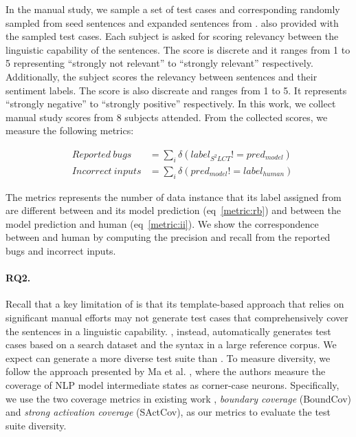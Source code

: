In the manual study, we sample a set of test cases and corresponding \lc randomly sampled
from seed sentences and expanded sentences from \tool. 
also provided with the sampled test cases. Each subject is asked for
scoring relevancy between the linguistic capability of the
sentences. The score is discrete and it ranges from 1 to 5
representing ``strongly not relevant'' to ``strongly relevant''
respectively. Additionally, the subject scores the relevancy between
sentences and their sentiment labels. The score is also discreate and
ranges from 1 to 5. It represents ``strongly negative'' to ``strongly
positive'' respectively. In this work, we collect manual study scores
from 8 subjects attended. From the collected scores, we measure the
following metrics:

\begin{eqnarray}
  &Reported\:bugs &=\sum_{i} \delta(label_{S^2LCT}!=pred_{model}) \label{metric:rb}\\
  &Incorrect\:inputs &= \sum_{i} \delta(pred_{model}!=label_{human}) \label{metric:ii}
\end{eqnarray}

The metrics represents the number of data instance that its label
assigned from are different between \tool and its model prediction
(eq~\ref{metric:rb}) and between the model prediction and human
(eq~\ref{metric:ii}). We show the correspondence between \tool and
human by computing the precision and recall from the reported bugs and
incorrect inputs.

\paragraph{RQ2.}
Recall that a key limitation of \Cklst is that its template-based
approach that relies on significant manual efforts may not generate test cases that comprehensively cover the sentences
in a linguistic capability. \tool, instead, automatically generates test cases based on a search
dataset and the syntax in a large reference corpus. We expect \tool can generate a more diverse test suite
than \Cklst. To measure diversity, we follow the approach presented by Ma et al. \cite{ma2018deepgauge},
where the authors measure the coverage of NLP model intermediate states as corner-case neurons.
Specifically, we use the   two coverage metrics in existing work \cite{ma2018deepgauge}, \textit{boundary coverage} (BoundCov) and \textit{strong activation coverage} (SActCov), as our metrics to evaluate the test suite diversity.

